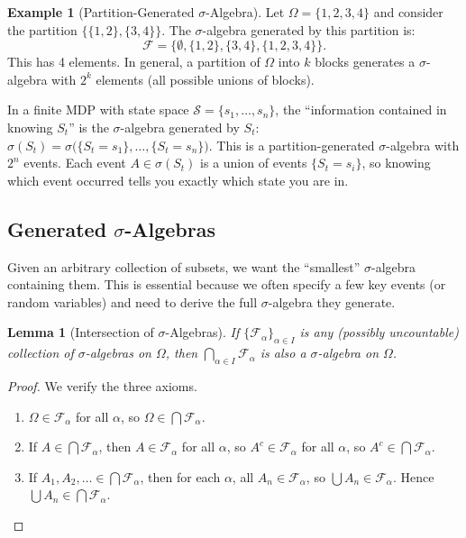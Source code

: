 \documentclass[11pt,a4paper]{article}
\theoremstyle{definition}
\newtheorem{example}{Example}[section]
\theoremstyle{plain}
\newtheorem{lemma}[theorem]{Lemma}
\theoremstyle{remark}
\begin{document}
\begin{example}[Partition-Generated $\sigma$-Algebra]
\label{ex:partition}
Let $\Omega = \{1,2,3,4\}$ and consider the partition $\{\{1,2\}, \{3,4\}\}$.
The $\sigma$-algebra generated by this partition is:
\begin{equation}
    \mathcal{F} = \bigl\{\emptyset, \{1,2\}, \{3,4\}, \{1,2,3,4\}\bigr\}.
\end{equation}
This has 4 elements. In general, a partition of $\Omega$ into $k$ blocks generates
a $\sigma$-algebra with $2^k$ elements (all possible unions of blocks).
\end{example}

\begin{rlconnection}[Connection to RL]
In a finite MDP with state space $\mathcal{S} = \{s_1, \ldots, s_n\}$, the
``information contained in knowing $S_t$'' is the $\sigma$-algebra generated by $S_t$:
$\sigma(S_t) = \sigma\bigl(\{S_t = s_1\}, \ldots, \{S_t = s_n\}\bigr)$.
This is a partition-generated $\sigma$-algebra with $2^n$ events. Each event
$A \in \sigma(S_t)$ is a union of events $\{S_t = s_i\}$, so knowing which
event occurred tells you exactly which state you are in.
\end{rlconnection}

\subsection{Generated $\sigma$-Algebras}
\label{subsec:generated}

Given an arbitrary collection of subsets, we want the ``smallest'' $\sigma$-algebra
containing them. This is essential because we often specify a few key events
(or random variables) and need to derive the full $\sigma$-algebra they generate.

\begin{lemma}[Intersection of $\sigma$-Algebras]
\label{lem:intersection}
If $\{\mathcal{F}_\alpha\}_{\alpha \in I}$ is any (possibly uncountable) collection
of $\sigma$-algebras on $\Omega$, then $\bigcap_{\alpha \in I} \mathcal{F}_\alpha$
is also a $\sigma$-algebra on $\Omega$.
\end{lemma}

\begin{proof}
We verify the three axioms.
\begin{enumerate}[nosep,label=(\roman*)]
    \item $\Omega \in \mathcal{F}_\alpha$ for all $\alpha$, so $\Omega \in \bigcap \mathcal{F}_\alpha$.
    \item If $A \in \bigcap \mathcal{F}_\alpha$, then $A \in \mathcal{F}_\alpha$ for all $\alpha$, so $A^c \in \mathcal{F}_\alpha$ for all $\alpha$, so $A^c \in \bigcap \mathcal{F}_\alpha$.
    \item If $A_1, A_2, \ldots \in \bigcap \mathcal{F}_\alpha$, then for each $\alpha$, all $A_n \in \mathcal{F}_\alpha$, so $\bigcup A_n \in \mathcal{F}_\alpha$. Hence $\bigcup A_n \in \bigcap \mathcal{F}_\alpha$. \qedhere
\end{enumerate}
\end{proof}
\end{document}
